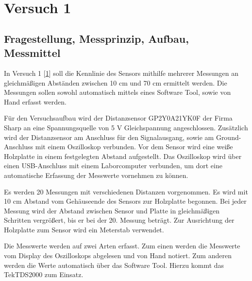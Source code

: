 \documentclass[12pt, oneside, a4paper, \docLanguage]{report}
\begin{document}
\cite{Franz2016n}
\cite{Franz2016e}

%
%
\chapter{Versuch 1}
\label{chap:VERSUCH_1}

\section{Fragestellung, Messprinzip, Aufbau, Messmittel}
\label{chap:VERSUCH_1_FRAGESTELLUNG}
In Versuch 1 [\ref{chap:VERSUCH_1}] soll die Kennlinie des Sensors mithilfe mehrerer Messungen an gleichmäßigen Abständen zwischen 10 cm und 70 cm ermittelt werden. Die Messungen sollen sowohl automatisch mittels eines Software Tool, sowie von Hand erfasst werden.

Für den Versuchsaufbau wird der Distanzsensor GP2Y0A21YK0F der Firma Sharp an eine Spannungsquelle von 5 V Gleichspannung angeschlossen. Zusätzlich wird der Distanzsensor am Anschluss für den Signalausgang, sowie am Ground-Anschluss mit einem Oszilloskop verbunden. Vor dem Sensor wird eine weiße Holzplatte in einem festgelegten Abstand aufgestellt. Das Oszilloskop wird über einen USB-Anschluss mit einem Laborcomputer verbunden, um dort eine automatische Erfassung der Messwerte vornehmen zu können.

Es werden 20 Messungen mit verschiedenen Distanzen vorgenommen. Es wird mit 10 cm Abstand vom Gehäuseende des Sensors zur Holzplatte begonnen. Bei jeder Messung wird der Abstand zwischen Sensor und Platte in gleichmäßigen Schritten vergrößert, bis er bei der 20. Messung beträgt. Zur Ausrichtung der Holzplatte zum Sensor wird ein Meterstab verwendet.

Die Messwerte werden auf zwei Arten erfasst. Zum einen werden die Messwerte vom Display des Oszilloskops abgelesen und von Hand notiert. Zum anderen werden die Werte automatisch über das Software Tool. Hierzu kommt das TekTDS2000 zum Einsatz.
\end{document}
